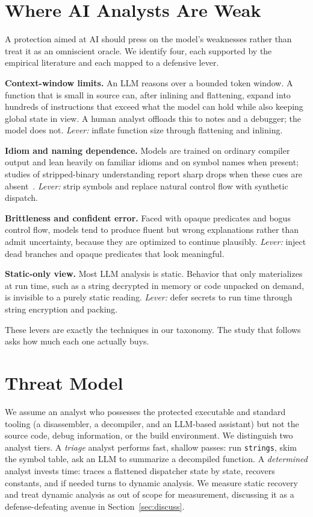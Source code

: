 \documentclass[conference]{IEEEtran}
\begin{document}
\section{Where AI Analysts Are Weak}\label{sec:weak}
A protection aimed at AI should press on the model's weaknesses rather than treat
it as an omniscient oracle. We identify four, each supported by the empirical
literature and each mapped to a defensive lever.

\textbf{Context-window limits.} An LLM reasons over a bounded token window. A
function that is small in source can, after inlining and flattening, expand into
hundreds of instructions that exceed what the model can hold while also keeping
global state in view. A human analyst offloads this to notes and a debugger; the
model does not. \emph{Lever:} inflate function size through flattening and
inlining.

\textbf{Idiom and naming dependence.} Models are trained on ordinary compiler
output and lean heavily on familiar idioms and on symbol names when present;
studies of stripped-binary understanding report sharp drops when these cues are
absent~\cite{howfar,empirical}. \emph{Lever:} strip symbols and replace natural
control flow with synthetic dispatch.

\textbf{Brittleness and confident error.} Faced with opaque predicates and bogus
control flow, models tend to produce fluent but wrong explanations rather than
admit uncertainty, because they are optimized to continue plausibly.
\emph{Lever:} inject dead branches and opaque predicates that look meaningful.

\textbf{Static-only view.} Most LLM analysis is static. Behavior that only
materializes at run time, such as a string decrypted in memory or code unpacked
on demand, is invisible to a purely static reading. \emph{Lever:} defer secrets
to run time through string encryption and packing.

These levers are exactly the techniques in our taxonomy. The study that follows
asks how much each one actually buys.

\section{Threat Model}\label{sec:threat}
We assume an analyst who possesses the protected executable and standard tooling
(a disassembler, a decompiler, and an LLM-based assistant) but not the source
code, debug information, or the build environment. We distinguish two analyst
tiers. A \emph{triage} analyst performs fast, shallow passes: run
\texttt{strings}, skim the symbol table, ask an LLM to summarize a decompiled
function. A \emph{determined} analyst invests time: traces a flattened
dispatcher state by state, recovers constants, and if needed turns to dynamic
analysis. We measure static recovery and treat dynamic analysis as out of scope
for measurement, discussing it as a defense-defeating avenue in
Section~\ref{sec:discuss}.
\end{document}
